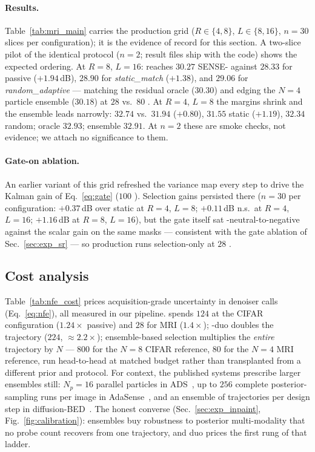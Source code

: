 
\paragraph{Results.} Table~\ref{tab:mri_main} carries the production
grid ($R\in\{4,8\}$, $L\in\{8,16\}$, $n{=}30$ slices per
configuration); it is the evidence of record for this section. A
two-slice pilot of the identical protocol\RLOCAL{} ($n{=}2$; result
files ship with the code) shows the expected ordering. At $R{=}8$,
$L{=}16$: \pvas{} reaches $30.27$ SENSE-\psnrm{} against $28.33$ for
passive \pigdm{} ($+1.94$\,dB), $28.90$ for \emph{static\_match}
($+1.38$), and $29.06$ for \emph{random\_adaptive} --- matching the
residual oracle ($30.30$) and edging the $N{=}4$ particle ensemble
($30.18$) at $28$ vs.\ $80$ \nfe. At $R{=}4$, $L{=}8$ the margins
shrink and the ensemble leads narrowly: \pvas{} $32.74$ vs.\ $31.94$
\pigdm{} ($+0.80$), $31.55$ static ($+1.19$), $32.34$ random; oracle
$32.93$; ensemble $32.91$. At $n{=}2$ these are smoke checks, not
evidence; we attach no significance to them.

\paragraph{Gate-on ablation.} An earlier variant of this grid refreshed
the variance map every step to drive the Kalman gain of
Eq.~\ref{eq:gate} ($100$ \nfe). Selection gains persisted there
($n{=}30$ per configuration: $+0.37$\,dB over static at $R{=}4$,
$L{=}8$; $+0.11$\,dB n.s.\ at $R{=}4$, $L{=}16$; $+1.16$\,dB at
$R{=}8$, $L{=}16$)\RLOCAL, but the gate itself sat
\psnrm-neutral-to-negative against the scalar \pigdm{} gain on the same
masks --- consistent with the gate ablation of Sec.~\ref{sec:exp_sr}
--- so production runs selection-only at $28$ \nfe.

\subsection{Cost analysis}\label{sec:cost}

Table~\ref{tab:nfe_cost} prices acquisition-grade uncertainty in
denoiser calls (Eq.~\ref{eq:nfe}), all measured in our
pipeline\RLOCAL. \pvas{} spends $124$ \nfe{} at the CIFAR configuration
($1.24\times$ passive) and $28$ for MRI ($1.4\times$); \pvas-duo
doubles the trajectory ($224$, ${\approx}2.2\times$); ensemble-based
selection multiplies the \emph{entire} trajectory by $N$ --- $800$
\nfe{} for the $N{=}8$ CIFAR reference, $80$ for the $N{=}4$ MRI
reference, run head-to-head at matched budget rather than transplanted
from a different prior and protocol. For context, the published systems
prescribe larger ensembles still: $N_p{=}16$ parallel particles in
ADS\CITED~\cite{nolan2025ads}, up to $256$ complete posterior-sampling
runs per image in AdaSense\CITED~\cite{elata2024adasense}, and an
ensemble of trajectories per design step in
diffusion-BED\CITED~\cite{iollo2025bedmri}. The honest converse
(Sec.~\ref{sec:exp_inpaint}, Fig.~\ref{fig:calibration}): ensembles buy
robustness to posterior multi-modality that no probe count recovers
from one trajectory, and duo prices the first rung of that ladder.
